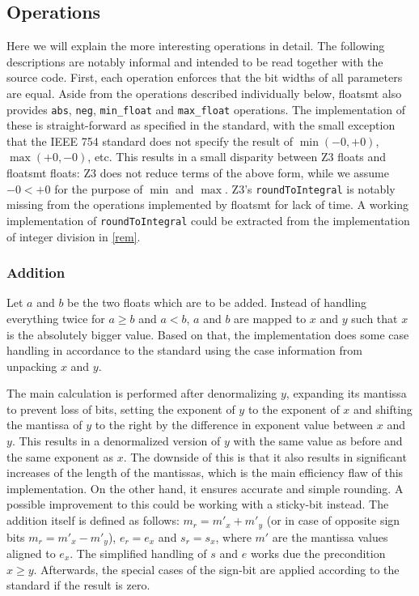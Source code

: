 \documentclass[a4paper,UKenglish,cleveref, autoref, thm-restate]{lipics-v2019}
\begin{document}
\subsection{Operations}
Here we will explain the more interesting operations in detail. The following descriptions are notably informal and intended to be read together with the source code. First, each operation enforces that the bit widths of all parameters are equal. Aside from the operations described individually below, floatsmt also provides \verb|abs|, \verb|neg|, \verb|min_float| and \verb|max_float| operations. The implementation of these is straight-forward as specified in the standard, with the small exception that the IEEE 754 standard does not specify the result of $\min(-0, +0)$, $\max(+0, -0)$, etc. This results in a small disparity between Z3 floats and floatsmt floats: Z3 does not reduce terms of the above form, while we assume $-0 < +0$ for the purpose of $\min$ and $\max$. Z3's \verb|roundToIntegral| is notably missing from the operations implemented by floatsmt for lack of time. A working implementation of \verb|roundToIntegral| could be extracted from the implementation of integer division in \cref{rem}.

\subsubsection{Addition}
Let $a$ and $b$ be the two floats which are to be added. Instead of handling everything twice for $a\geq b$ and $a<b$, $a$ and $b$ are mapped to $x$ and $y$ such that $x$ is the absolutely bigger value. Based on that, the implementation does some case handling in accordance to the standard using the case information from unpacking $x$ and $y$.

The main calculation is performed after denormalizing $y$, expanding its mantissa to prevent loss of bits, setting the exponent of $y$ to the exponent of $x$ and shifting the mantissa of $y$ to the right by the difference in exponent value between $x$ and $y$. This results in a denormalized version of $y$ with the same value as before and the same exponent as $x$. The downside of this is that it also results in significant increases of the length of the mantissas, which is the main efficiency flaw of this implementation. On the other hand, it ensures accurate and simple rounding. A possible improvement to this could be working with a sticky-bit instead. The addition itself is defined as follows: $m_r = m'_x + m'_y$ (or in case of opposite sign bits $m_r = m'_x - m'_y$), $e_r = e_x$ and $s_r = s_x$, where $m'$ are the mantissa values aligned to $e_x$. The simplified handling of $s$ and $e$ works due the 
precondition $x \geq y$. Afterwards, the special cases of the sign-bit are applied according to the standard if the result is zero.
\end{document}
